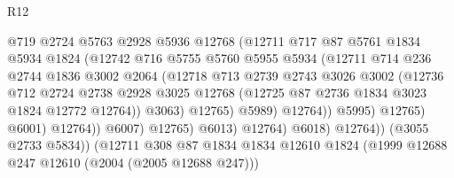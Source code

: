 \begin{lexlean}{R12}
\begin{coremodule}
                                    @719
                                    @2724
                                    @5763
                                    @2928
                                    @5936
                                    @12768
                                    (@12711
                                      @717
                                      @87
                                      @5761
                                      @1834
                                      @5934
                                      @1824
                                      (@12742
                                        @716
                                        @5755
                                        @5760
                                        @5955
                                        @5934
                                        (@12711
                                          @714
                                          @236
                                          @2744
                                          @1836
                                          @3002
                                          @2064
                                          (@12718
                                            @713
                                            @2739
                                            @2743
                                            @3026
                                            @3002
                                            (@12736
                                              @712
                                              @2724
                                              @2738
                                              @2928
                                              @3025
                                              @12768
                                              (@12725 @87 @2736 @1834 @3023 @1824 @12772 @12764))
                                            @3063)
                                          @12765)
                                        @5989)
                                      @12764))
                                  @5995)
                                @12765)
                              @6001)
                            @12764))
                        @6007)
                      @12765)
                    @6013)
                  @12764)
                @6018)
              @12764))
          (@3055 @2733 @5834))
        (@12711
          @308
          @87
          @1834
          @1834
          @12610
          @1824
          (@1999 @12688 @247 @12610 (@2004 (@2005 @12688 @247)))

\end{coremodule}
\end{lexlean}
